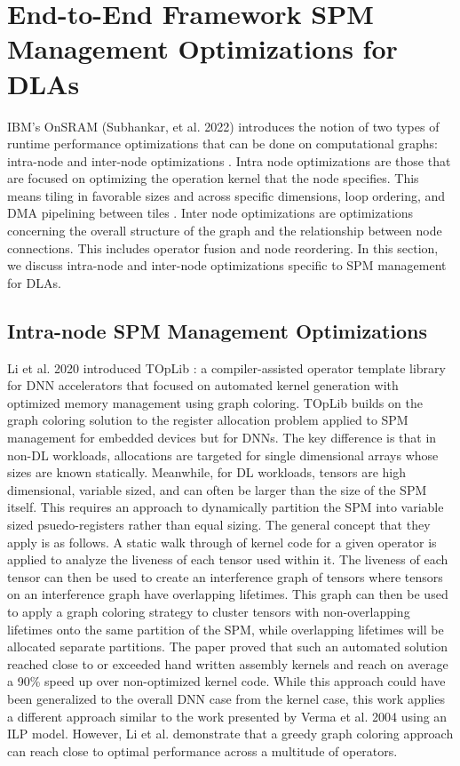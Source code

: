 \section{End-to-End Framework SPM Management Optimizations for DLAs}

IBM's OnSRAM (Subhankar, et al. 2022) introduces the notion of two types of
runtime performance optimizations that can be done on computational graphs:
intra-node and inter-node optimizations \cite{onsram}. Intra node optimizations
are those that are focused on optimizing the operation kernel that the node
specifies. This means tiling in favorable sizes and across specific dimensions,
loop ordering, and DMA pipelining between tiles \cite{aladdin}.
Inter node optimizations are optimizations concerning the overall structure 
of the graph and the relationship between node connections. This includes
operator fusion and node reordering\cite{onsram}. In this section, we discuss
intra-node and inter-node optimizations specific to SPM management for DLAs.

\subsection{Intra-node SPM Management Optimizations}
Li et al. 2020 introduced TOpLib \cite{toplib}: a compiler-assisted operator
template library for DNN accelerators that focused on automated kernel
generation with optimized memory management using graph coloring. TOpLib builds
on the graph coloring solution to the register allocation problem applied to
SPM management for embedded devices but for DNNs. The key difference is that in
non-DL workloads, allocations are targeted for single dimensional arrays whose
sizes are known statically. Meanwhile, for DL workloads, tensors are high
dimensional, variable sized, and can often be larger than the size of the SPM
itself.  This requires an approach to dynamically partition the SPM into
variable sized psuedo-registers rather than equal sizing. The general concept
that they apply is as follows. A static walk through of kernel code for a given
operator is applied to analyze the liveness of each tensor used within it.  The
liveness of each tensor can then be used to create an interference graph of
tensors where tensors on an interference graph have overlapping lifetimes.
This graph can then be used to apply a graph coloring strategy to cluster
tensors with non-overlapping lifetimes onto the same partition of the SPM,
while overlapping lifetimes will be allocated separate partitions. The paper
proved that such an automated solution reached close to or exceeded hand
written assembly kernels and reach on average a 90\% speed up over
non-optimized kernel code.  While this approach could have been generalized to
the overall DNN case from the kernel case, this work applies a different
approach similar to the work presented by Verma et al. 2004 using an ILP model.
However, Li et al. demonstrate that a greedy graph coloring approach can reach
close to optimal performance across a multitude of operators.

